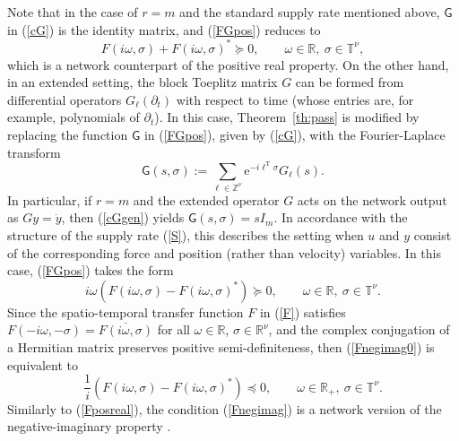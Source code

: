 \documentclass[letterpaper, 10pt, conference]{ieeeconf}  %
\def\d{\partial}
\def\mZ{\mathbb{Z}}    %
\def\mR{\mathbb{R}}    %
\def\rT{\mathrm{T}}        %
\def\re{\mathrm{e}}        %
\def\rd{\mathrm{d}}        %
\def\sG{\mathsf{G}}
\def\mT{\mathbb{T}}
\def\mZ{\mathbb{Z}}
\begin{document}
Note that in the case of $r=m$ and the standard supply rate mentioned above,  $\sG$ in (\ref{cG}) is the identity matrix, and (\ref{FGpos}) reduces to
\begin{equation}
\label{Fposreal}
  F(i\omega,\sigma) +
  F(i\omega,\sigma)^*
  \succcurlyeq
  0,
  \qquad
  \omega \in \mR,\
  \sigma \in \mT^\nu,
\end{equation}
which is a network counterpart of the positive real property. %
On the other hand, in an extended setting, the block Toeplitz matrix $G$ can be formed from differential operators $G_\ell(\d_t)$ with respect to time (whose entries  are, for example, polynomials of $\d_t$). In this case, Theorem~\ref{th:pass} is modified by replacing the function $\sG$ in (\ref{FGpos}), given by (\ref{cG}), with the Fourier-Laplace transform
\begin{equation}
\label{cGgen}
    \sG(s,\sigma)
    :=
    \sum_{\ell\in \mZ^\nu}
    \re^{-i\ell^{\rT}\sigma}
    G_\ell(s).
\end{equation}
In particular, if $r=m$ and the extended operator $G$ acts on the network output as $Gy = \dot{y}$, then (\ref{cGgen}) yields $\sG(s,\sigma) = sI_m$. In accordance with the structure  of the supply rate (\ref{S}),  this describes the setting when $u$ and $y$ consist of the corresponding force and position (rather than velocity) variables.  In this case,
 (\ref{FGpos})  takes the form
\begin{equation}
\label{Fnegimag0}
  i\omega (F(i\omega,\sigma) -
  F(i\omega,\sigma)^*)
  \succcurlyeq
  0,
  \qquad
  \omega \in \mR,\
  \sigma \in \mT^\nu.
\end{equation}
Since the spatio-temporal transfer function $F$ in (\ref{F}) satisfies $F(-i\omega, -\sigma) = \overline{F(i\omega,\sigma)}$ for all $\omega \in \mR$, $\sigma \in \mR^\nu$, and the complex conjugation of a Hermitian matrix preserves positive semi-definiteness, then  (\ref{Fnegimag0}) is equivalent to
\begin{equation}
\label{Fnegimag}
    \frac{1}{i}
  (F(i\omega,\sigma) -
  F(i\omega,\sigma)^*)
  \preccurlyeq
  0,
  \qquad
  \omega \in \mR_+,\
  \sigma \in \mT^\nu.
\end{equation}
Similarly to (\ref{Fposreal}), the condition (\ref{Fnegimag}) is a network version of the negative-imaginary property \cite{PL_2010,XPL_2010}.
%
%
%
\end{document}
